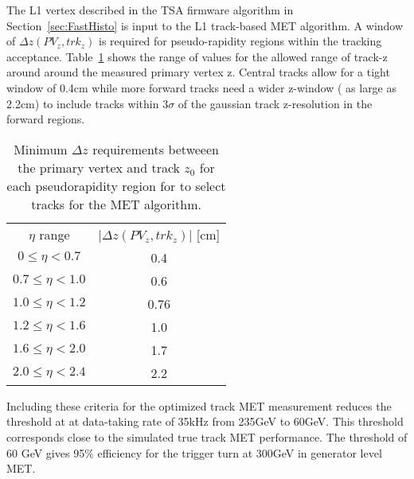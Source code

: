 The L1 vertex described in the TSA firmware algorithm in Section~\ref{sec:FastHisto} is input to the L1 track-based MET algorithm. A window of $\Delta z\left(PV_{z}, trk_{z}\right)$ is required for pseudo-rapidity regions within the tracking acceptance. Table~\ref{tab:zwindows} shows the range of values for the allowed range of track-z around around the measured primary vertex z. Central tracks allow for a tight window of 0.4cm while more forward tracks need a wider z-window ( as large as 2.2cm) to include tracks within $3\sigma$ of the gaussian track z-resolution in the forward regions.
\begin{table}[h]
\begin{tabular}{|c|c|}
$\eta$ range & $\vert \Delta z\left(PV_{z}, trk_{z}\right) \vert$  [cm] \\
 $0\leq \eta < 0.7$ & 0.4\\
$0.7\leq \eta <1.0 $& 0.6\\
$1.0\leq \eta < 1.2 $ & 0.76\\
$1.2\leq \eta < 1.6$ & 1.0 \\
$1.6\leq \eta <  2.0 $& 1.7 \\
$2.0\leq  \eta < 2.4 $ & 2.2 \\
\end{tabular}
\caption{Minimum $\Delta z $ requirements betweeen the primary vertex and track $z_{0}$ for each pseudorapidity region for to select tracks for the MET algorithm. }
\label{tab:zwindows}
\end{table}

Including these criteria for the optimized track MET measurement reduces the threshold at at data-taking rate of 35kHz from 235GeV to 60GeV. This threshold corresponds close to the simulated true track MET performance. The threshold of 60 GeV gives 95$\%$ efficiency for the trigger turn at 300GeV in generator level MET. 


